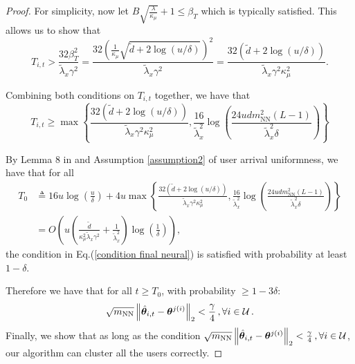 \begin{proof}
For simplicity, now let $B \sqrt{\frac{\lambda}{\kappa_\mu}} + 1 \leq \beta_T$ which is typically satisfied. This allows us to show that
\begin{equation}
    T_{i,t} > \frac{32\beta_T^2}{\tilde{\lambda}_x \gamma^2} = \frac{32 \left(\frac{1}{\kappa_\mu} \sqrt{ \widetilde{d} + 2\log(u/\delta)}\right)^2}{\tilde{\lambda}_x \gamma^2} = \frac{32 \left( \widetilde{d} + 2\log(u/\delta)\right)}{\tilde{\lambda}_x \gamma^2 \kappa_\mu^2}.
\label{condition final neural}
\end{equation}

Combining both conditions on $T_{i,t}$ together, we have that
\begin{equation}
T_{i,t}\geq \max\left\{\frac{32 \left( \widetilde{d} + 2\log(u/\delta)\right)}{\tilde{\lambda}_x \gamma^2 \kappa_\mu^2},  \frac{16}{\tilde{\lambda}_x^2}\log(\frac{24u d m_{\text{NN}}^2(L-1)}{\tilde{\lambda}_x^2\delta}) \right\}
\end{equation}

By Lemma 8 in \cite{li2018online} and Assumption \ref{assumption2} of user arrival uniformness, we have that for all
\begin{equation*}
    \begin{aligned}
        T_0&\triangleq 16u\log(\frac{u}{\delta})+4u \max\left\{\frac{32 \left( \widetilde{d} + 2\log(u/\delta)\right)}{\tilde{\lambda}_x \gamma^2 \kappa_\mu^2},  \frac{16}{\tilde{\lambda}_x^2}\log(\frac{24u d m_{\text{NN}}^2(L-1)}{\tilde{\lambda}_x^2\delta}) \right\}\\
        &= O\left(u \left( \frac{ \widetilde{d}}{\kappa_\mu^2\tilde{\lambda}_x \gamma^2} + \frac{1}{\tilde{\lambda}_x^2} \right)\log(\frac{1}{\delta}) \right),
    \end{aligned}
\end{equation*}
the condition in Eq.(\ref{condition final neural}) is satisfied with probability at least $1-\delta$.

Therefore we have that for all $t\geq T_0$, with probability $\geq 1-3\delta$:
\begin{equation}
    \sqrt{m_{\text{NN}}}\left\| \hat{\boldsymbol{\theta}}_{i,t}-\boldsymbol{\theta}^{j(i)} \right\|_2<\frac{\gamma}{4}\,,\forall{i\in\mathcal{U}}\,.
\end{equation}
Finally, we show that as long as the condition $\sqrt{m_{\text{NN}}}\left\| \hat{\boldsymbol{\theta}}_{i,t}-\boldsymbol{\theta}^{j(i)} \right\|_2<\frac{\gamma}{4}\,,\forall{i\in\mathcal{U}}$, our algorithm can cluster all the users correctly.


\end{proof}
